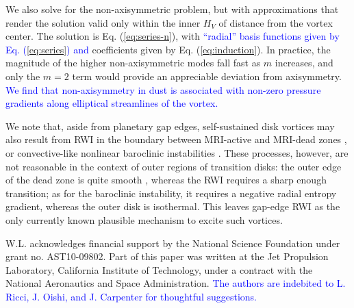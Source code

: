 \documentclass[apj]{emulateapj}
\def\blue#1{\textcolor{blue}{#1}}
\newcommand{\Eq}[1]{Eq. (\ref{#1})}
\newcommand{\eq}[1]{\Eq{#1}}
\begin{document}
We also solve for the non-axisymmetric problem, but with
approximations that render the solution valid only within 
the inner $H_V$ of distance from the vortex center. The solution is
\eq{eq:series-n}, with \blue{``radial'' basis functions given by
  \eq{eq:series} and} coefficients given by \eq{eq:induction}. In practice, the magnitude
of the higher non-axisymmetric modes fall fast as $m$ increases, and 
only the $m=2$ term would provide an appreciable deviation from
axisymmetry. \blue{We find that non-axisymmetry in dust 
is associated with non-zero pressure gradients along elliptical streamlines of the vortex.}

We note that, aside from planetary gap edges, self-sustained disk
vortices may also result from RWI in the boundary between MRI-active and MRI-dead zones \citep{Varniere-Tagger06,Lyra08,Lyra09a,Lyra-MacLow12}, or
convective-like nonlinear baroclinic instabilities \citep{Klahr-Bodenheimer03,Klahr04,Petersen07a,Petersen07b,Lesur-Papaloizou10,Lyra-Klahr11,Raettig13}. 
These processes, however, are not reasonable in the context of outer
regions of transition disks: the outer edge of the dead zone is quite smooth
\citep{Dzyurkevich13,Landry13}, whereas the RWI requires a 
sharp enough transition; as for the baroclinic instability, it
requires a negative radial entropy gradient, whereas the outer disk is
isothermal. This leaves gap-edge RWI as the only currently known plausible mechanism to excite such vortices. 

\acknowledgments W.L. acknowledges financial support by the National Science
Foundation under grant no. AST10-09802. Part of this paper was written
at the Jet Propulsion Laboratory, California Institute of Technology, under a contract with the
National Aeronautics and Space Administration. \blue{The authors are
  indebited to L. Ricci,  J. Oishi, and J. Carpenter for thoughtful suggestions.} 
\end{document}
